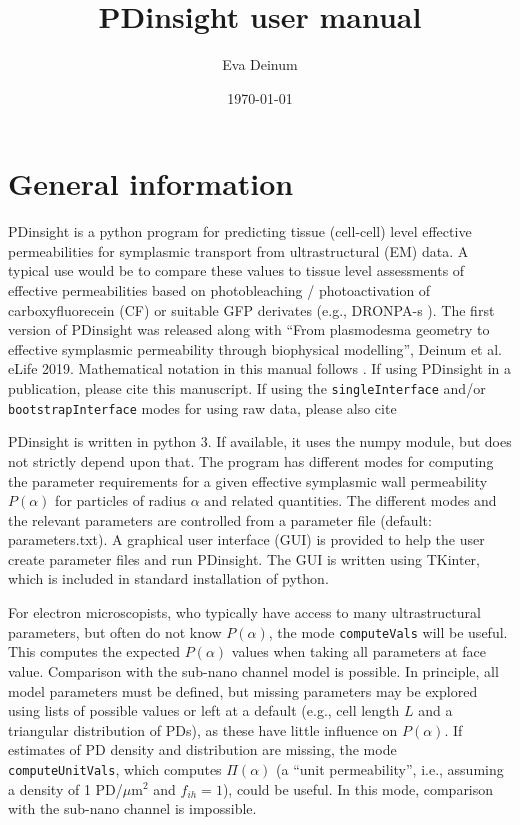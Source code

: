 \documentclass[a4paper,12pt]{article}
\author{Eva Deinum}
\title{PDinsight user manual}
\date{\today}
\newcommand{\patchy}{f_{ih}}
\begin{document}
\maketitle

\section{General information}
PDinsight is a python program for predicting tissue (cell-cell) level effective permeabilities for symplasmic transport from ultrastructural (EM) data. A typical use would be to compare these values to tissue level assessments of effective permeabilities based on photobleaching / photoactivation of carboxyfluorecein (CF) \citep{Rutschow.pp11} or suitable GFP derivates (e.g., DRONPA-s \citep{Gerlitz.pj18}). The first version of PDinsight was released along with ``From plasmodesma geometry to effective symplasmic permeability through biophysical modelling'', Deinum et al. eLife 2019. Mathematical notation in this manual follows \citep{Deinum.e19}. If using PDinsight in a publication, please cite this manuscript. If using the \texttt{singleInterface} and/or \texttt{bootstrapInterface} modes for using raw data, please also cite \citep{Deinum.p22}

PDinsight is written in python 3. If available, it uses the numpy module, but does not strictly depend upon that. The program has different modes for computing the parameter requirements for a given effective symplasmic wall permeability $P(\alpha)$ for particles of radius $\alpha$ and related quantities. The different modes and the relevant parameters are controlled from a parameter file (default: parameters.txt). A graphical user interface (GUI) is provided to help the user create parameter files and run PDinsight. The GUI is written using TKinter, which is included in standard installation of python.

For electron microscopists, who typically  have access to many ultrastructural parameters, but often do not know $P(\alpha)$, the mode \texttt{computeVals} will be useful. This computes the expected $P(\alpha)$ values when taking all parameters at face value. Comparison with the sub-nano channel model is possible. In principle, all model parameters must be defined, but missing parameters may be explored using lists of possible values or left at a default (e.g., cell length $L$ and a triangular distribution of PDs), as these have little influence on $P(\alpha)$. If estimates of PD density and distribution are missing, the mode \texttt{computeUnitVals}, which computes $\Pi(\alpha)$ (a ``unit permeability'', i.e., assuming a density of 1 PD/$\mu$m$^2$ and $\patchy=1$), could be useful. In this mode, comparison with the sub-nano channel is impossible. 
\end{document}
